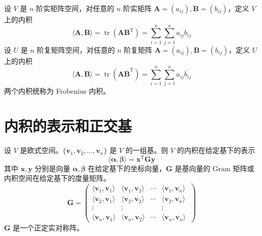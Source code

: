 \begin{definition}
    设 $V$ 是 $n$ 阶实矩阵空间，对任意的 $n$ 阶实矩阵 $\bm{A} = (a_{ij}), \bm{B} = (b_{ij})$，定义 $V$ 上的内积
    \[
        \langle \bm{A}, \bm{B} \rangle = \operatorname{tr}(\bm{AB}^{\mathrm{T}}) = \sum_{i = 1}^{n}\sum_{j = 1}^{n}a_{ij}b_{ij}
    \]
    设 $U$ 是 $n$ 阶复矩阵空间，对任意的 $n$ 阶复矩阵 $\bm{A} = (a_{ij}), \bm{B} = (b_{ij})$，定义 $U$ 上的内积
    \[
        \langle \bm{A}, \bm{B} \rangle = \operatorname{tr}(\bm{A}\overline{\bm{B}}^{\mathrm{T}}) = \sum_{i = 1}^{n}\sum_{j = 1}^{n}a_{ij}\overline{b_{ij}}
    \]
    两个内积统称为 Frobenius 内积。
\end{definition}


\section{内积的表示和正交基}

\begin{definition}
    设 $V$ 是欧式空间。$\{\bm{v}_1, \bm{v}_2, \ldots,\bm{v}_n\}$ 是 $V$ 的一组基。则 $V$ 的内积在给定基下的表示
    \[
        \langle \bm{\alpha}, \bm{\beta} \rangle = \bm{x}^{\mathrm{T}}\bm{Gy}
    \]
    其中 $\bm{x}, \bm{y}$ 分别是向量 $\bm{\alpha}, \bm{\beta}$ 在给定基下的坐标向量，$\bm{G}$ 是基向量的 Gram 矩阵或内积空间在给定基下的度量矩阵。
    \[
        \bm{G} = \begin{pmatrix}
            \langle \bm{v}_1, \bm{v}_1 \rangle & \langle \bm{v}_1, \bm{v}_2 \rangle & \cdots & \langle \bm{v}_1, \bm{v}_n \rangle   \\
            \langle \bm{v}_2, \bm{v}_1 \rangle & \langle \bm{v}_2, \bm{v}_2 \rangle & \cdots & \langle \bm{v}_2, \bm{v}_n \rangle   \\
            \vdots                             & \vdots                             & \      & \vdots                               \\
            \langle \bm{v}_n, \bm{v}_1 \rangle & \langle \bm{v}_n, \bm{v}_2 \rangle & \cdots & \langle \bm{v}_n, \bm{v}_n \rangle \
        \end{pmatrix}
    \]
    $\bm{G}$ 是一个正定实对称阵。
\end{definition}

